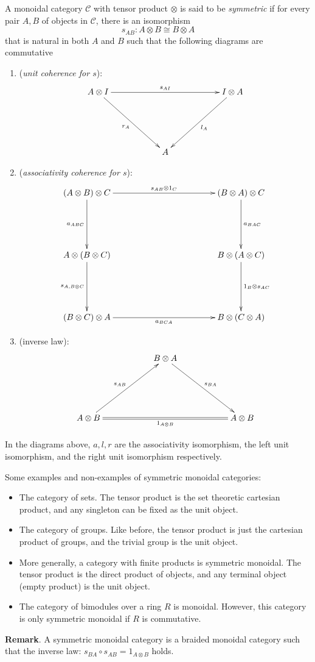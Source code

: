 A monoidal category $\mathcal{C}$ with tensor product $\otimes$ is said to be \emph{symmetric} if for every pair $A,B$ of objects in $\mathcal{C}$, there is an isomorphism $$s_{AB}:A\otimes B\cong B\otimes A$$ that is natural in both $A$ and $B$ such that the following diagrams are commutative
\begin{enumerate}
\item (\emph{unit coherence for $s$}):
$$\xymatrix@+=2cm{A\otimes I \ar[rr]^{s_{AI}} \ar[dr]_{r_A} & & I\otimes A \ar[dl]^{l_A} \\ & A &}$$
\item (\emph{associativity coherence for $s$}):
$$\xymatrix@+=2cm{ (A\otimes B)\otimes C \ar[rr]^{s_{AB}\otimes 1_C} \ar[d]_{a_{ABC}} & & (B\otimes A)\otimes C \ar[d]^{a_{BAC}} \\ A\otimes (B\otimes C) \ar[d]_{s_{A,B\otimes C}} & & B\otimes (A\otimes C) \ar[d]^{1_B\otimes s_{AC}} \\ (B\otimes C)\otimes A \ar[rr]_{a_{BCA}} & & B\otimes(C\otimes A)
}$$
\item (inverse law):
$$\xymatrix@+=2cm{& B\otimes A \ar[dr]^{s_{BA}} & \\ A\otimes B \ar[ur]^{s_{AB}} \ar@{=}[rr]_{1_{A\otimes B}} && A\otimes B }$$
\end{enumerate}
In the diagrams above, $a,l,r$ are the associativity isomorphism, the left unit isomorphism, and the right unit isomorphism respectively.

Some examples and non-examples of symmetric monoidal categories:
\begin{itemize}
\item The category of sets.  The tensor product is the set theoretic cartesian product, and any singleton can be fixed as the unit object.
\item The category of groups.  Like before, the tensor product is just the cartesian product of groups, and the trivial group is the unit object.
\item More generally, a category with finite products is symmetric monoidal.  The tensor product is the direct product of objects, and any terminal object (empty product) is the unit object.
\item The category of bimodules over a ring $R$ is monoidal.  However, this category is only symmetric monoidal if $R$ is commutative.
\end{itemize}

\textbf{Remark}.  A symmetric monoidal category is a braided monoidal category such that the inverse law: $s_{BA}\circ s_{AB}=1_{A\otimes B}$ holds.